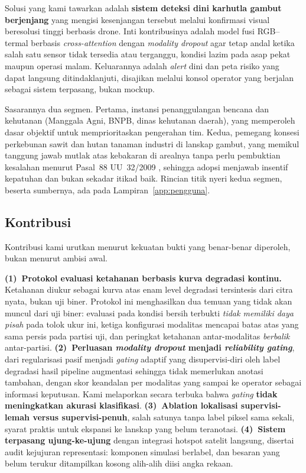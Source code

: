 Solusi yang kami tawarkan adalah \textbf{sistem deteksi dini karhutla gambut
berjenjang} yang mengisi kesenjangan tersebut melalui konfirmasi visual
beresolusi tinggi berbasis drone. Inti kontribusinya adalah model fusi
RGB--termal berbasis \emph{cross-attention} dengan \emph{modality dropout} agar
tetap andal ketika salah satu sensor tidak tersedia atau terganggu, kondisi
lazim pada asap pekat maupun operasi malam. Keluarannya adalah \emph{alert} dini
dan peta risiko yang dapat langsung ditindaklanjuti, disajikan melalui konsol
operator yang berjalan sebagai sistem terpasang, bukan mockup.

Sasarannya dua segmen. Pertama, instansi penanggulangan bencana dan kehutanan
(Manggala Agni, BNPB, dinas kehutanan daerah), yang memperoleh dasar objektif
untuk memprioritaskan pengerahan tim. Kedua, pemegang konsesi perkebunan sawit
dan hutan tanaman industri di lanskap gambut, yang memikul tanggung jawab mutlak
atas kebakaran di arealnya tanpa perlu pembuktian kesalahan menurut Pasal~88
UU~32/2009 \cite{uu32_2009}, sehingga adopsi menjawab insentif kepatuhan dan
bukan sekadar itikad baik. Rincian titik nyeri kedua segmen, beserta sumbernya,
ada pada Lampiran~\ref{app:pengguna}.

\subsection{Kontribusi}

Kontribusi kami urutkan menurut kekuatan bukti yang benar-benar diperoleh,
bukan menurut ambisi awal.

\textbf{(1)~Protokol evaluasi ketahanan berbasis kurva degradasi kontinu.}
Ketahanan diukur sebagai kurva atas enam level degradasi tersintesis dari citra
nyata, bukan uji biner. Protokol ini menghasilkan dua temuan yang tidak akan
muncul dari uji biner: evaluasi pada kondisi bersih terbukti \emph{tidak memiliki
daya pisah} pada tolok ukur ini, ketiga konfigurasi modalitas mencapai batas
atas yang sama persis pada partisi uji, dan peringkat ketahanan antar-modalitas
\emph{berbalik} antar-partisi.
\textbf{(2)~Perluasan \emph{modality dropout} menjadi \emph{reliability gating}},
dari regularisasi pasif menjadi \emph{gating} adaptif yang disupervisi-diri oleh
label degradasi hasil pipeline augmentasi sehingga tidak memerlukan anotasi
tambahan, dengan skor keandalan per modalitas yang sampai ke operator sebagai
informasi keputusan. Kami melaporkan secara terbuka bahwa \emph{gating}
\textbf{tidak meningkatkan akurasi klasifikasi}.
\textbf{(3)~Ablation lokalisasi supervisi-lemah versus supervisi-penuh}, salah
satunya tanpa label piksel sama sekali, syarat praktis untuk ekspansi ke lanskap
yang belum teranotasi.
\textbf{(4)~Sistem terpasang ujung-ke-ujung} dengan integrasi hotspot satelit
langsung, disertai audit kejujuran representasi: komponen simulasi berlabel, dan
besaran yang belum terukur ditampilkan kosong alih-alih diisi angka rekaan.

